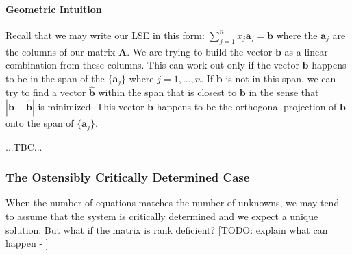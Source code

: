 \paragraph{Geometric Intuition} 
Recall that we may write our LSE in this form: $\sum_{j=1}^{n}  x_j \mathbf{a}_j  = \mathbf{b}$ where the $\mathbf{a}_j$ are the columns of our matrix $\mathbf{A}$. We are trying to build the vector $\mathbf{b}$ as a linear combination from these columns. This can work out only if the vector $\mathbf{b}$ happens to be in the span of the $\{ \mathbf{a}_j \}$ where $j = 1, \ldots, n$. If $\mathbf{b}$ is not in this span, we can try to find a vector $\hat{\mathbf{b}}$ within the span that is closest to $\mathbf{b}$ in the sense that $|\mathbf{b} - \hat{\mathbf{b}}|$ is minimized. This vector $\hat{\mathbf{b}}$ happens to be the orthogonal projection of $\mathbf{b}$ onto the span of $\{ \mathbf{a}_j \}$.

...TBC...








\subsubsection{The Ostensibly Critically Determined Case}
When the number of equations matches the number of unknowns, we may tend to assume that the system is critically determined and we expect a unique solution. But what if the matrix is rank deficient? [TODO: explain what can happen - ] %


